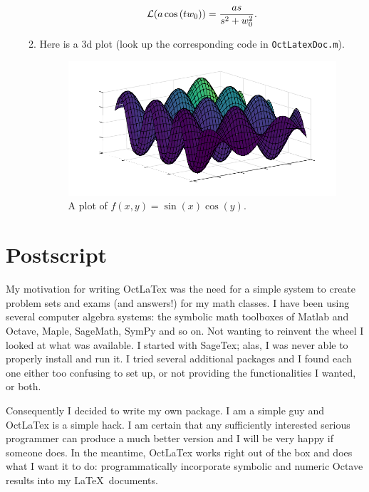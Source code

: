 \documentclass{article}
\begin{document}
\begin{enumerate}
\begin{enumerate}
 \[
 {\cal L}(a \cos{\left(t w_{0} \right)})=\frac{a s}{s^{2} + w_{0}^{2}}.
 \]
 \item Here is a 3d  plot (look up the corresponding code in \texttt{OctLatexDoc.m}).
 \begin{figure}[H]
 \centering
 \includegraphics[scale=0.85]{FIG002-inc}
 \caption{A plot of \(f(x,y)=\sin(x)\cos(y)\).}
 \end{figure}
 \end{enumerate}
 \bigskip
 
 \end{enumerate}  

 \section{Postscript}
 My motivation for writing \textsf{OctLaTex} was the need for a simple system to create problem sets and exams 
 (and answers!) for my math classes. I have been using several computer algebra systems: 
 the symbolic math toolboxes of \textsf{Matlab} and \textsf{Octave}, \textsf{Maple}, \textsf{SageMath}, \textsf{SymPy} and so on.
 Not wanting to reinvent the wheel I looked at what was available. I started with \textsf{SageTex}; alas, I was
 never able to properly install and run it. I tried several additional packages and I found each one either 
 too confusing to set up, or not providing the functionalities I wanted, or both.
 
 Consequently I decided to write my own package. I am a simple guy and \textsf{OctLaTex} is a simple hack. 
 I am certain that any sufficiently interested serious programmer can produce a much better version
 and I will be very happy if someone does. 
 In the meantime, \textsf{OctLaTex} works  right out of the box and does what I want it to do: 
 programmatically incorporate symbolic and numeric \textsf{Octave} results into my \LaTeX\  documents. 
 
\end{document}
